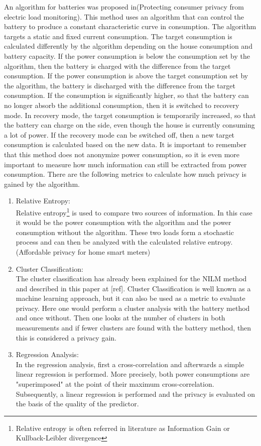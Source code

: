 An algorithm for batteries was proposed in(Protecting consumer privacy
from electric load monitoring). This method uses an algorithm that can control the battery to produce a constant characteristic curve in consumption. The algorithm targets a static and fixed current consumption. The target consumption is calculated differently by the algorithm depending on the house consumption and battery capacity. If the power consumption is below the consumption set by the algorithm, then the battery is charged with the difference from the target consumption. If the power consumption is above the target consumption set by the algorithm, the battery is discharged with the difference from the target consumption. If the consumption is significantly higher, so that the battery can no longer absorb the additional consumption, then it is switched to recovery mode. In recovery mode, the target consumption is temporarily increased, so that the battery can charge on the side, even though the house is currently consuming a lot of power. If the recovery mode can be switched off, then a new target consumption is calculated based on the new data. It is important to remember that this method does not anonymize power consumption, so it is even more important to measure how much information can still be extracted from power consumption. There are the following metrics to calculate how much privacy is gained by the algorithm.
\begin{enumerate}
\item Relative Entropy:\\
Relative entropy\footnote[2]{Relative entropy is often referred in literature as Information Gain or Kullback-Leibler divergence} is used to compare two sources of information. In this case it would be the power consumption with the algorithm and the power consumption without the algorithm. These two loads form a stochastic process and can then be analyzed with the calculated relative entropy. (Affordable privacy for home
smart meters)
\item Cluster Classification:\\
The cluster classification has already been explained for the NILM method and described in this paper at [ref]. Cluster Classification is well known as a machine learning approach, but it can also be used as a metric to evaluate privacy. Here one would perform a cluster analysis with the battery method and once without. Then one looks at the number of clusters in both measurements and if fewer clusters are found with the battery method, then this is considered a privacy gain.
\item Regression Analysis:\\
In the regression analysis, first a cross-correlation and afterwards a simple linear regression is performed. More precisely, both power consumptions are "superimposed" at the point of their maximum cross-correlation. Subsequently, a linear regression is performed and the privacy is evaluated on the basis of the quality of the predictor.
\end{enumerate}
